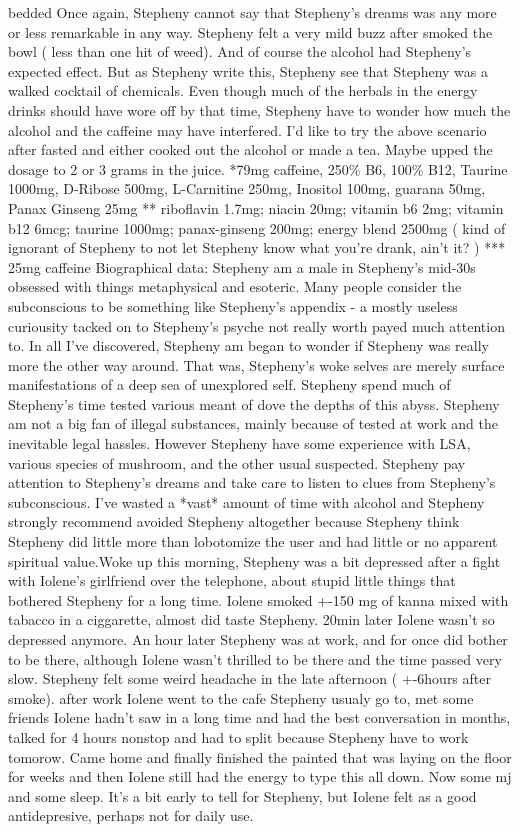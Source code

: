 \documentclass[12pt]{book}
\begin{document}
bedded Once again, Stepheny cannot say that Stepheny's dreams was any more or less remarkable in any way. Stepheny felt a very mild buzz after smoked the bowl ( less than one hit of weed). And of course the alcohol had Stepheny's expected effect. But as Stepheny write this, Stepheny see that Stepheny was a walked cocktail of chemicals. Even though much of the herbals in the energy drinks should have wore off by that time, Stepheny have to wonder how much the alcohol and the caffeine may have interfered. I'd like to try the above scenario after fasted and either cooked out the alcohol or made a tea. Maybe upped the dosage to 2 or 3 grams in the juice. *79mg caffeine, 250\% B6, 100\% B12, Taurine 1000mg, D-Ribose 500mg, L-Carnitine 250mg, Inositol 100mg, guarana 50mg, Panax Ginseng 25mg ** riboflavin 1.7mg; niacin 20mg; vitamin b6 2mg; vitamin b12 6mcg; taurine 1000mg; panax-ginseng 200mg; energy blend 2500mg ( kind of ignorant of Stepheny to not let Stepheny know what you're drank, ain't it? ) *** 25mg caffeine Biographical data: Stepheny am a male in Stepheny's mid-30s obsessed with things metaphysical and esoteric. Many people consider the subconscious to be something like Stepheny's appendix - a mostly useless curiousity tacked on to Stepheny's psyche not really worth payed much attention to. In all I've discovered, Stepheny am began to wonder if Stepheny was really more the other way around. That was, Stepheny's woke selves are merely surface manifestations of a deep sea of unexplored self. Stepheny spend much of Stepheny's time tested various meant of dove the depths of this abyss. Stepheny am not a big fan of illegal substances, mainly because of tested at work and the inevitable legal hassles. However Stepheny have some experience with LSA, various species of mushroom, and the other usual suspected. Stepheny pay attention to Stepheny's dreams and take care to listen to clues from Stepheny's subconscious. I've wasted a *vast* amount of time with alcohol and Stepheny strongly recommend avoided Stepheny altogether because Stepheny think Stepheny did little more than lobotomize the user and had little or no apparent spiritual value.Woke up this morning, Stepheny was a bit depressed after a fight with Iolene's girlfriend over the telephone, about stupid little things that bothered Stepheny for a long time. Iolene smoked +-150 mg of kanna mixed with tabacco in a ciggarette, almost did taste Stepheny. 20min later Iolene wasn't so depressed anymore. An hour later Stepheny was at work, and for once did bother to be there, although Iolene wasn't thrilled to be there and the time passed very slow. Stepheny felt some weird headache in the late afternoon ( +-6hours after smoke). after work Iolene went to the cafe Stepheny usualy go to, met some friends Iolene hadn't saw in a long time and had the best conversation in months, talked for 4 hours nonstop and had to split because Stepheny have to work tomorow. Came home and finally finished the painted that was laying on the floor for weeks and then Iolene still had the energy to type this all down. Now some mj and some sleep. It's a bit early to tell for Stepheny, but Iolene felt as a good antidepresive, perhaps not for daily use.
\end{document}
